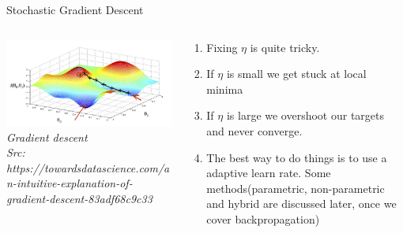 \begin{frame}{Stochastic Gradient Descent}
	\begin{columns}[T]
	\begin{column}{0.4\textwidth}
	  \includegraphics[width=\textwidth]{images/grad-desc.png}
	  \tiny{\textit{Gradient descent\\ Src: https://towardsdatascience.com/an-intuitive-explanation-of-gradient-descent-83adf68c9c33}}
	\end{column}
	\begin{column}{0.6\textwidth}
	\begin{enumerate}[$\bullet$]
	\item Fixing $\eta$ is quite tricky.\pause
	\item If $\eta$ is small we get stuck at local minima\pause
	\item If $\eta$ is large we overshoot our targets and never converge.
	\item The best way to do things is to use a adaptive learn rate. Some methods(parametric, non-parametric and hybrid are discussed later, once we cover backpropagation)
	\end{enumerate}
	\end{column}
  \end{columns}
  \end{frame}
